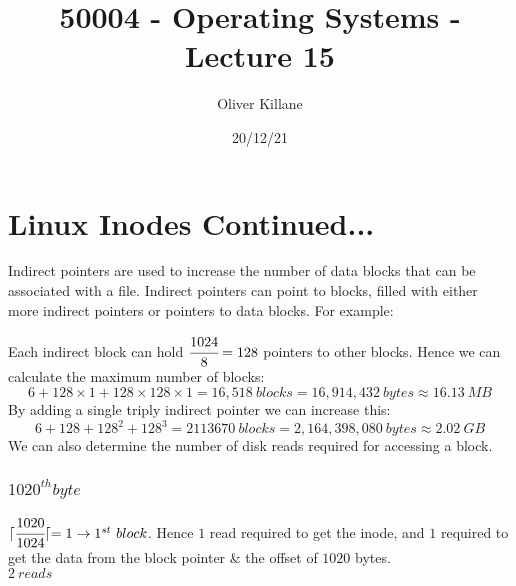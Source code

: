 \documentclass{report}
\title{50004 - Operating Systems - Lecture 15}
\author{Oliver Killane}
\date{20/12/21}
\begin{document}
    \maketitle

    \section*{Linux Inodes Continued...}
        Indirect pointers are used to increase the number of data blocks that can be associated with a file. Indirect pointers can point to blocks, filled with either more indirect pointers or pointers to data blocks.
        For example:
        \\ 

        Each indirect block can hold $\cfrac{1024}{8} = 128$ pointers to other blocks. Hence we can calculate the  maximum number of blocks:
        \[6 + 128 \times 1 + 128 \times 128 \times 1 = 16,518 \ blocks = 16,914,432 \ bytes \approx 16.13 \ MB\]
        By adding a single triply indirect pointer we can increase this:
        \[6 + 128 + 128^2 + 128^3 = 2113670 \ blocks = 2,164,398,080 \ bytes \approx 2.02 \ GB\]
        We can also determine the number of disk reads required for accessing a block.
        \\ 
        \subsubsection*{$1020^{th} byte$}
            $\lceil \cfrac{1020}{1024} \lceil = 1  \to 1^{st} \ block$. Hence $1$ read required to get the inode, and $1$ required to get the data from the block pointer \& the offset of $1020$ bytes.
            \\ \textbf{$2 \ reads$}
\end{document}

